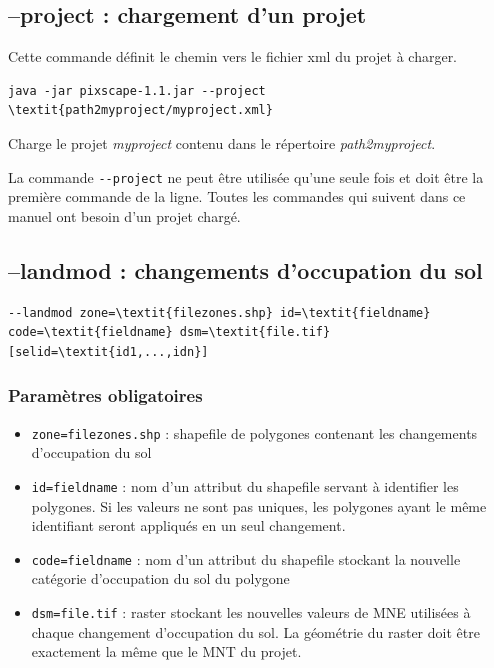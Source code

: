\documentclass{report}
\begin{document}
\subsection{--project : chargement d'un projet}
Cette commande définit le chemin vers le fichier xml du projet à charger.
\begin{Verbatim}[commandchars=\\\{\}]
java -jar pixscape-1.1.jar --project \textit{path2myproject/myproject.xml}
\end{Verbatim}
Charge le projet \textit{myproject} contenu dans le répertoire \textit{path2myproject}.

La commande \verb|--project| ne peut être utilisée qu'une seule fois et doit être la première commande de la ligne.
Toutes les commandes qui suivent dans ce manuel ont besoin d'un projet chargé.

\subsection{--landmod : changements d'occupation du sol}

\begin{Verbatim}[commandchars=\\\{\}]
--landmod zone=\textit{filezones.shp} id=\textit{fieldname} code=\textit{fieldname} dsm=\textit{file.tif} [selid=\textit{id1,...,idn}]
\end{Verbatim}

\subsubsection{Paramètres obligatoires}
\begin{itemize}
	\item \verb|zone=filezones.shp| : shapefile de polygones contenant les changements d'occupation du sol
	\item \verb|id=fieldname| : nom d'un attribut du shapefile servant à identifier les polygones. Si les valeurs ne sont pas uniques, les polygones ayant le même identifiant seront appliqués en un seul changement.
	\item \verb|code=fieldname| : nom d'un attribut du shapefile stockant la nouvelle catégorie d'occupation du sol du polygone
	\item \verb|dsm=file.tif| : raster stockant les nouvelles valeurs de MNE utilisées à chaque changement d'occupation du sol. La géométrie du raster doit être exactement la même que le MNT du projet.
\end{itemize}
\end{document}
